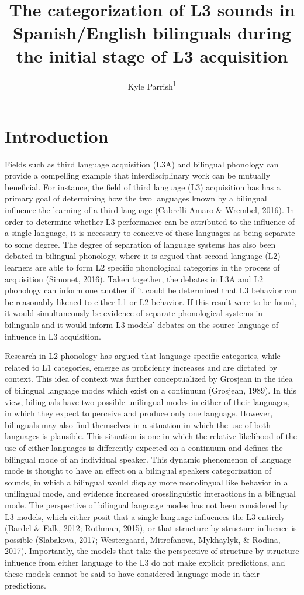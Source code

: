 \documentclass[
  man]{apa6}
\title{The categorization of L3 sounds in Spanish/English bilinguals during the initial stage of L3 acquisition}
\author{Kyle Parrish\textsuperscript{1}}
\date{}
\affiliation{\vspace{0.5cm}\textsuperscript{1} Rutgers University}
\begin{document}
\maketitle

\hypertarget{introduction}{%
\section{Introduction}\label{introduction}}

Fields such as third language acquisition (L3A) and bilingual phonology can provide a compelling example that interdisciplinary work can be mutually beneficial.
For instance, the field of third language (L3) acquisition has has a primary goal of determining how the two languages known by a bilingual influence the learning of a third language (Cabrelli Amaro \& Wrembel, 2016).
In order to determine whether L3 performance can be attributed to the influence of a single language, it is necessary to conceive of these languages as being separate to some degree.
The degree of separation of language systems has also been debated in bilingual phonology, where it is argued that second language (L2) learners are able to form L2 specific phonological categories in the process of acquisition (Simonet, 2016).
Taken together, the debates in L3A and L2 phonology can inform one another if it could be determined that L3 behavior can be reasonably likened to either L1 or L2 behavior.
If this result were to be found, it would simultaneously be evidence of separate phonological systems in bilinguals and it would inform L3 models' debates on the source language of influence in L3 acquisition.

Research in L2 phonology has argued that language specific categories, while related to L1 categories, emerge as proficiency increases and are dictated by context.
This idea of context was further conceptualized by Grosjean in the idea of bilingual language modes which exist on a continuum (Grosjean, 1989).
In this view, bilinguals have two possible unilingual modes in either of their languages, in which they expect to perceive and produce only one language.
However, bilinguals may also find themselves in a situation in which the use of both languages is plausible.
This situation is one in which the relative likelihood of the use of either languages is differently expected on a continuum and defines the bilingual mode of an individual speaker.
This dynamic phenomenon of language mode is thought to have an effect on a bilingual speakers categorization of sounds, in which a bilingual would display more monolingual like behavior in a unilingual mode, and evidence increased crosslinguistic interactions in a bilingual mode.
The perspective of bilingual language modes has not been considered by L3 models, which either posit that a single language influences the L3 entirely (Bardel \& Falk, 2012; Rothman, 2015), or that structure by structure influence is possible (Slabakova, 2017; Westergaard, Mitrofanova, Mykhaylyk, \& Rodina, 2017).
Importantly, the models that take the perspective of structure by structure influence from either language to the L3 do not make explicit predictions, and these models cannot be said to have considered language mode in their predictions.
\end{document}
